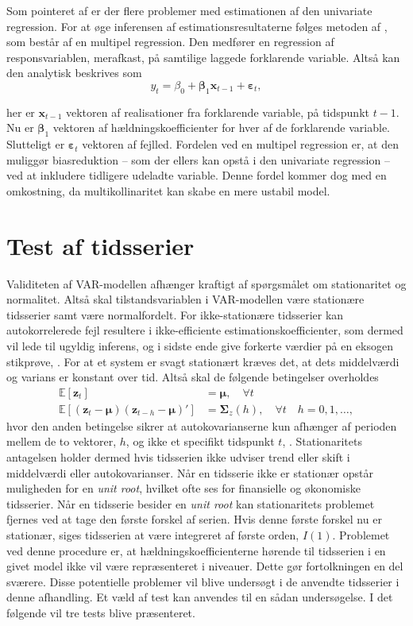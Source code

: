 \documentclass[
  a4paper,
  oneside]{memoir}
\begin{document}
Som pointeret af \citep{Stambaugh1999} er der flere problemer med estimationen af den univariate regression. For at øge inferensen af estimationsresultaterne følges metoden af \citep{Goyal2007}, som består af en multipel regression. Den medfører en regression af responsvariablen, merafkast, på samtilige laggede forklarende variable. Altså kan den analytisk beskrives som
\[y_t=\beta_0+\bm{\beta}_1\bm{x}_{t-1}+\bm{\varepsilon}_t,\]

her er \(\bm{x}_{t-1}\) vektoren af realisationer fra forklarende variable, på tidspunkt \(t-1\). Nu er \(\bm{\beta}_1\) vektoren af hældningskoefficienter for hver af de forklarende variable. Slutteligt er \(\bm{\varepsilon}_t\) vektoren af fejlled. Fordelen ved en multipel regression er, at den muliggør biasreduktion -- som der ellers kan opstå i den univariate regression -- ved at inkludere tidligere udeladte variable. Denne fordel kommer dog med en omkostning, da multikollinaritet kan skabe en mere ustabil model.

\hypertarget{sektestaftids}{%
\section{Test af tidsserier}\label{sektestaftids}}

Validiteten af VAR-modellen afhænger kraftigt af spørgsmålet om stationaritet og normalitet. Altså skal tilstandsvariablen i VAR-modellen være stationære tidsserier samt være normalfordelt. For ikke-stationære tidsserier kan autokorrelerede fejl resultere i ikke-efficiente estimationskoefficienter, som dermed vil lede til ugyldig inferens, og i sidste ende give forkerte værdier på en eksogen stikprøve, \citep{Granger1974}. For at et system er svagt stationært kræves det, at dets middelværdi og varians er konstant over tid. Altså skal de følgende betingelser overholdes
\begin{align*}
\mathbb{E}\left[\bm{z}_t\right]&=\bm{\mu},\quad\forall t\\
\mathbb{E}\left[(\bm{z}_t-\bm{\mu}) (\bm{z}_{t-h}-\bm{\mu})'\right]&=\bm{\Sigma}_z(h),\quad \forall t\quad h=0,1,\dots,
\end{align*}
hvor den anden betingelse sikrer at autokovarianserne kun afhænger af perioden mellem de to vektorer, \(h\), og ikke et specifikt tidspunkt \(t\), \citep{Lutkepohl2005}. Stationaritets antagelsen holder dermed hvis tidsserien ikke udviser trend eller skift i middelværdi eller autokovarianser. Når en tidsserie ikke er stationær opstår muligheden for en \emph{unit root}, hvilket ofte ses for finansielle og økonomiske tidsserier. Når en tidsserie besider en \emph{unit root} kan stationaritets problemet fjernes ved at tage den første forskel af serien. Hvis denne første forskel nu er stationær, siges tidsserien at være integreret af første orden, \(I(1)\). Problemet ved denne procedure er, at hældningskoefficienterne hørende til tidsserien i en givet model ikke vil være repræsenteret i niveauer. Dette gør fortolkningen en del sværere. Disse potentielle problemer vil blive undersøgt i de anvendte tidsserier i denne afhandling. Et væld af test kan anvendes til en sådan undersøgelse. I det følgende vil tre tests blive præsenteret.
\end{document}
